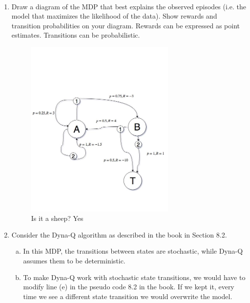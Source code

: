\documentclass{exam}
\begin{document}
\begin{problem}
\ \newline

\begin{enumerate}
    \item Draw a diagram of the MDP that best explains the observed episodes (i.e. the model that maximizes the likelihood of the data). Show rewards and transition probabilities on your diagram. Rewards can be expressed as point estimates. Transitions can be probabilistic.
    \begin{solutionorlines}[2in]
        \begin{subfigure}[b]{\textwidth}
            \includegraphics[width=0.7\textwidth]{homeworks/files/diagram.jpg}
        \caption{\hspace{-18em}Is it a sheep? Yes}
    \end{subfigure}
    \end{solutionorlines}
    \item Consider the Dyna-Q algorithm as described in the book in Section 8.2.
    \begin{solutionorlines}[2in]
        \begin{enumerate}[(a)]
            \item 
            In this MDP, the transitions between states are stochastic, while Dyna-Q assumes them to be deterministic.
            \item
            To make Dyna-Q work with stochastic state transitions, we would have to modify line (e) in the pseudo code 8.2 in the book. If we kept it, every time we see a different state transition we would overwrite the model.
            

\end{enumerate}
\end{solutionorlines}
\end{enumerate}
\end{problem}
\end{document}
